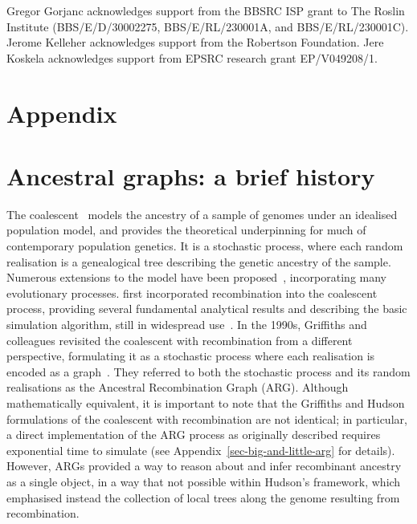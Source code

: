 \documentclass{article}
\begin{document}
Gregor Gorjanc acknowledges support from the BBSRC ISP grant to The Roslin Institute
(BBS/E/D/30002275, BBS/E/RL/230001A, and BBS/E/RL/230001C).
Jerome Kelleher acknowledges support from the Robertson Foundation.
Jere Koskela acknowledges support from EPSRC research grant EP/V049208/1.




\setcounter{secnumdepth}{2} %

\section*{Appendix}
\appendix

\setcounter{table}{0}
\setcounter{figure}{0}
\renewcommand{\thetable}{A\arabic{table}}
\renewcommand{\thefigure}{A\arabic{figure}}

\section{Ancestral graphs: a brief history}
\label{sec-arg-history}
The coalescent~\citep{kingman1982coalescent,kingman1982genealogy,
hudson1983testing, tajima1983evolutionary} models the ancestry of a sample of
genomes under an idealised population model, and provides the theoretical
underpinning for much of contemporary population genetics.
It is a stochastic process, where each random realisation
is a genealogical tree describing the genetic ancestry of the sample.
Numerous extensions to the model have been
proposed~\citep{hudson1990gene,hein2004gene,wakely2008coalescent},
incorporating many evolutionary processes.
\citet{hudson1983properties}
first incorporated recombination into the coalescent process,
providing several fundamental analytical results
and describing the basic simulation algorithm, still in
widespread use~\citep{hudson2002generating,kelleher2016efficient,
baumdicker2021efficient}.
In the 1990s, Griffiths and colleagues revisited the
coalescent with recombination from a different perspective,
formulating it as a stochastic process where each realisation
is encoded as a graph~\citep{griffiths1991two,ethier1990two,
griffiths1996ancestral,griffiths1997ancestral}.
They referred to both the stochastic process and
its random realisations as the Ancestral Recombination Graph (ARG).
Although mathematically equivalent, it is
important to note that the Griffiths and Hudson formulations of
the coalescent with recombination are not identical;
in particular, a direct implementation of the ARG process
as originally described requires exponential time to simulate
(see Appendix~\ref{sec-big-and-little-arg} for details).
However, ARGs provided a way
to reason about and infer recombinant ancestry as a single object,
in a way that not possible within Hudson's framework, which emphasised
instead the collection of local trees along the genome
resulting from recombination.
\end{document}
